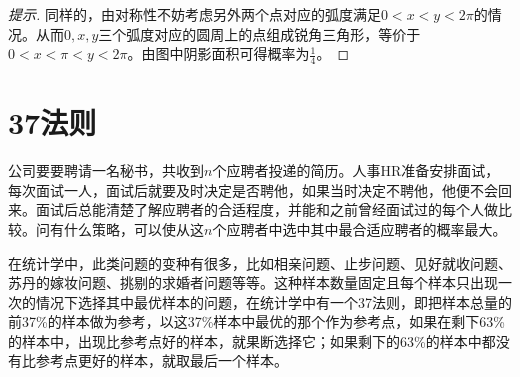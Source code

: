 \begin{proof}[提示]
  同样的，由对称性不妨考虑另外两个点对应的弧度满足$0<x<y<2\pi$的情况。从而$0,x,y$三个弧度对应的圆周上的点组成锐角三角形，等价于$0 < x < \pi < y < 2\pi$。由图中阴影面积可得概率为$\frac14$。
\end{proof}



\section{37法则}
\label{sec:37-rule}

\begin{example}
  公司要要聘请一名秘书，共收到$n$个应聘者投递的简历。人事HR准备安排面试，每次面试一人，面试后就要及时决定是否聘他，如果当时决定不聘他，他便不会回来。面试后总能清楚了解应聘者的合适程度，并能和之前曾经面试过的每个人做比较。问有什么策略，可以使从这$n$个应聘者中选中其中最合适应聘者的概率最大。
\end{example}

在统计学中，此类问题的变种有很多，比如相亲问题、止步问题、见好就收问题、苏丹的嫁妆问题、挑剔的求婚者问题等等。这种样本数量固定且每个样本只出现一次的情况下选择其中最优样本的问题，在统计学中有一个37法则，即把样本总量的前37\%的样本做为参考，以这37\%样本中最优的那个作为参考点，如果在剩下63\%的样本中，出现比参考点好的样本，就果断选择它；如果剩下的63\%的样本中都没有比参考点更好的样本，就取最后一个样本。

